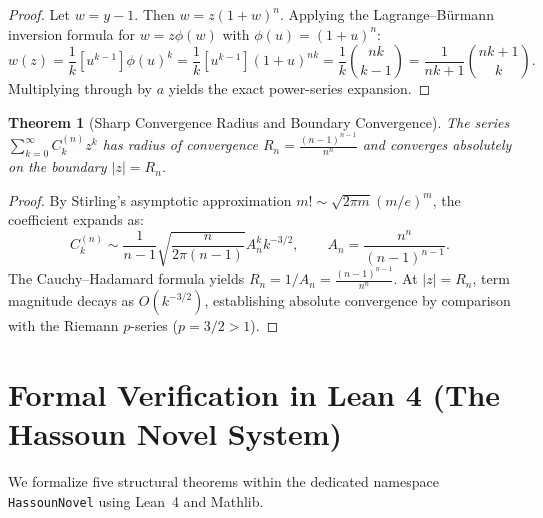 \documentclass[11pt,a4paper]{article}
\newtheorem{theorem}{Theorem}[section]
\theoremstyle{definition}
\begin{document}
\begin{proof}
Let $w = y - 1$. Then $w = z (1+w)^n$. Applying the Lagrange--B\"urmann inversion formula for $w = z \phi(w)$ with $\phi(u) = (1+u)^n$:
\begin{equation}
[z^k] w(z) = \frac{1}{k} [u^{k-1}] \phi(u)^k = \frac{1}{k} [u^{k-1}] (1+u)^{nk} = \frac{1}{k} \binom{nk}{k-1} = \frac{1}{nk+1} \binom{nk+1}{k}.
\end{equation}
Multiplying through by $a$ yields the exact power-series expansion.
\end{proof}

\begin{theorem}[Sharp Convergence Radius and Boundary Convergence]
The series $\sum_{k=0}^{\infty} C_k^{(n)} z^k$ has radius of convergence $R_n = \frac{(n-1)^{n-1}}{n^n}$ and converges absolutely on the boundary $|z| = R_n$.
\end{theorem}

\begin{proof}
By Stirling's asymptotic approximation $m! \sim \sqrt{2\pi m} (m/e)^m$, the coefficient expands as:
\begin{equation}
C_k^{(n)} \sim \frac{1}{n-1} \sqrt{\frac{n}{2\pi(n-1)}} A_n^k k^{-3/2}, \qquad A_n = \frac{n^n}{(n-1)^{n-1}}.
\end{equation}
The Cauchy--Hadamard formula yields $R_n = 1/A_n = \frac{(n-1)^{n-1}}{n^n}$. At $|z| = R_n$, term magnitude decays as $O(k^{-3/2})$, establishing absolute convergence by comparison with the Riemann $p$-series ($p = 3/2 > 1$).
\end{proof}

\section{Formal Verification in Lean 4 (The Hassoun Novel System)}

We formalize five structural theorems within the dedicated namespace \texttt{HassounNovel} using Lean~4 and Mathlib.
\end{document}
